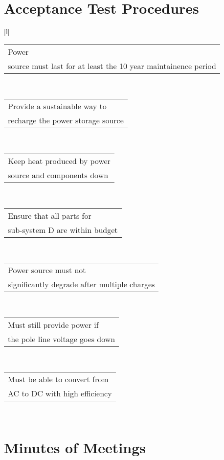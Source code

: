 \documentclass[12pt]{article}
\begin{document}
\section{Acceptance Test Procedures}
\begin{center}

\begin{table}[tbh]
\begin{tabular}{|l|}
\hline
{}    \\ \hline
\begin{tabular}[c]{@{}l@{}}Power\\   source must last for at least the 10 year maintainence period\end{tabular} \\ \hline
\begin{tabular}[c]{@{}l@{}}Provide a sustainable way to\\   recharge the power storage source\end{tabular}      \\ \hline
\begin{tabular}[c]{@{}l@{}}Keep heat produced by power\\   source and components down\end{tabular}      \\ \hline
\begin{tabular}[c]{@{}l@{}}Ensure that all parts for\\   sub-system D are within budget\end{tabular}    \\ \hline
\begin{tabular}[c]{@{}l@{}}Power source must not\\   significantly degrade after multiple charges\end{tabular}  \\ \hline
\begin{tabular}[c]{@{}l@{}}Must still provide power if\\   the pole line voltage goes down\end{tabular} \\ \hline
\begin{tabular}[c]{@{}l@{}}Must be able to convert from\\   AC to DC with high efficiency\end{tabular}  \\ \hline
\end{tabular}
\end{table}
\end{center}
\newpage
\section{Minutes of Meetings}

\newpage
%
%
\end{document}
